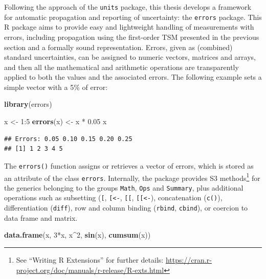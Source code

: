 \documentclass[twoside,nohyper]{tufte-book}
\newenvironment{Shaded}{}{}
\newcommand{\KeywordTok}[1]{\textcolor[rgb]{0.00,0.44,0.13}{\textbf{#1}}}
\newcommand{\DecValTok}[1]{\textcolor[rgb]{0.25,0.63,0.44}{#1}}
\newcommand{\FloatTok}[1]{\textcolor[rgb]{0.25,0.63,0.44}{#1}}
\newcommand{\StringTok}[1]{\textcolor[rgb]{0.25,0.44,0.63}{#1}}
\newcommand{\OperatorTok}[1]{\textcolor[rgb]{0.40,0.40,0.40}{#1}}
\newcommand{\NormalTok}[1]{#1}
\theoremstyle{definition}
\theoremstyle{definition}
\theoremstyle{definition}
\theoremstyle{remark}
\begin{document}
Following the approach of the \texttt{units} package, this thesis
develops a framework for automatic propagation and reporting of
uncertainty: the \texttt{errors}
package\cite[0pt]{R-errors}.
This R package aims to provide easy and lightweight handling of
measurements with errors, including propagation using the first-order
TSM presented in the previous section and a formally sound
representation. Errors, given as (combined) standard uncertainties, can
be assigned to numeric vectors, matrices and arrays, and then all the
mathematical and arithmetic operations are transparently applied to both
the values and the associated errors. The following example sets a
simple vector with a 5\% of error:

\begin{Shaded}
\begin{Highlighting}[]
\KeywordTok{library}\NormalTok{(errors)}

\NormalTok{x <-}\StringTok{ }\DecValTok{1}\OperatorTok{:}\DecValTok{5}
\KeywordTok{errors}\NormalTok{(x) <-}\StringTok{ }\NormalTok{x }\OperatorTok{*}\StringTok{ }\FloatTok{0.05}
\NormalTok{x}
\end{Highlighting}
\end{Shaded}

\begin{verbatim}
## Errors: 0.05 0.10 0.15 0.20 0.25
## [1] 1 2 3 4 5
\end{verbatim}

The \texttt{errors()} function assigns or retrieves a vector of errors,
which is stored as an attribute of the class \texttt{errors}.
Internally, the package provides S3 methods\footnote{See ``Writing R
  Extensions'' for further details:
  \url{https://cran.r-project.org/doc/manuals/r-release/R-exts.html}}
for the generics belonging to the groups \texttt{Math}, \texttt{Ops} and
\texttt{Summary}, plus additional operations such as subsetting
(\texttt{{[}}, \texttt{{[}\textless{}-}, \texttt{{[}{[}},
\texttt{{[}{[}\textless{}-}), concatenation (\texttt{c()}),
differentiation (\texttt{diff}), row and column binding (\texttt{rbind},
\texttt{cbind}), or coercion to data frame and matrix.

\begin{Shaded}
\begin{Highlighting}[]
\KeywordTok{data.frame}\NormalTok{(x, }\DecValTok{3}\OperatorTok{*}\NormalTok{x, x}\OperatorTok{^}\DecValTok{2}\NormalTok{, }\KeywordTok{sin}\NormalTok{(x), }\KeywordTok{cumsum}\NormalTok{(x))}
\end{Highlighting}
\end{Shaded}
\end{document}
